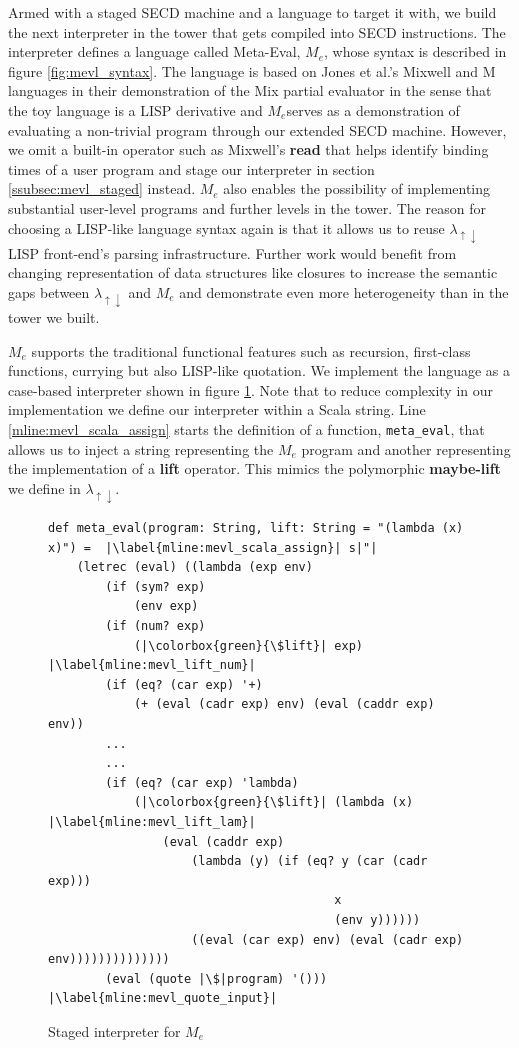 \documentclass[a4paper,12pt,twoside,openright]{report}
\theoremstyle{definition}
\newcommand{\mslang}{$\lambda_{\uparrow\downarrow}$}
\newcommand{\mevl}{$M_{e}$}
\begin{document}
Armed with a staged SECD machine and a language to target it with, we build the next interpreter in the tower that gets compiled into SECD instructions. The interpreter defines a language called Meta-Eval, \mevl, whose syntax is described in figure \ref{fig:mevl_syntax}. The language is based on Jones et al.'s Mixwell and M languages in their demonstration of the Mix partial evaluator \cite{jones1989mix} in the sense that the toy language is a LISP derivative and \mevl serves as a demonstration of evaluating a non-trivial program through our extended SECD machine. However, we omit a built-in operator such as Mixwell's \textbf{read} that helps identify binding times of a user program and stage our interpreter in section \ref{ssubsec:mevl_staged} instead. \mevl{} also enables the possibility of implementing substantial user-level programs and further levels in the tower. The reason for choosing a LISP-like language syntax again is that it allows us to reuse \mslang{} LISP front-end's parsing infrastructure. Further work would benefit from changing representation of data structures like closures to increase the semantic gaps between \mslang{} and \mevl{} and demonstrate even more heterogeneity than in the tower we built.

\mevl{} supports the traditional functional features such as recursion, first-class functions, currying but also LISP-like quotation. We implement the language as a case-based interpreter shown in figure \ref{lst:mevl}. Note that to reduce complexity in our implementation we define our interpreter within a Scala string. Line \ref{mline:mevl_scala_assign} starts the definition of a function, \texttt{meta\_eval}, that allows us to inject a string representing the \mevl{} program and another representing the implementation of a \textbf{lift} operator. This mimics the polymorphic \textbf{maybe-lift} we define in \mslang.

\begin{figure}[htp!]
\centering
\begin{verbatim}
def meta_eval(program: String, lift: String = "(lambda (x) x)") =  |\label{mline:mevl_scala_assign}| s|"|
    (letrec (eval) ((lambda (exp env)
        (if (sym? exp)
            (env exp)
        (if (num? exp)
            (|\colorbox{green}{\$lift}| exp) |\label{mline:mevl_lift_num}|
        (if (eq? (car exp) '+)
            (+ (eval (cadr exp) env) (eval (caddr exp) env))
        ...
        ...
        (if (eq? (car exp) 'lambda)
            (|\colorbox{green}{\$lift}| (lambda (x) |\label{mline:mevl_lift_lam}|
                (eval (caddr exp)
                    (lambda (y) (if (eq? y (car (cadr exp)))
                                        x
                                        (env y))))))
                    ((eval (car exp) env) (eval (cadr exp) env))))))))))))))
        (eval (quote |\$|program) '())) |\label{mline:mevl_quote_input}|
\end{verbatim}
\caption{Staged interpreter for \mevl}
\label{lst:mevl}
\end{figure}
\end{document}
